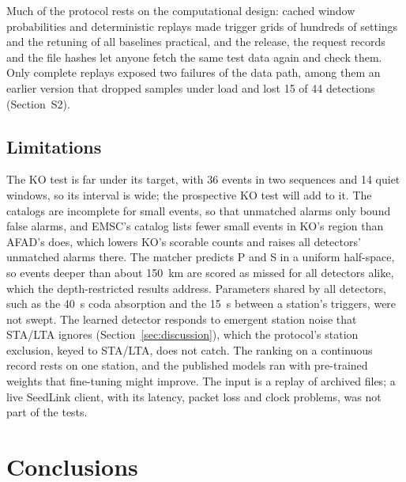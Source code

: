 \documentclass[a4paper,fleqn]{cas-sc}
\newcommand{\stalta}{STA/LTA}
\begin{document}
Much of the protocol rests on the computational design: cached window
probabilities and deterministic replays made trigger grids of hundreds of settings
and the retuning of all baselines practical, and the release, the request records
and the file hashes let anyone fetch the same test data again and check them. Only
complete replays exposed two failures of the data path, among them an earlier version
that dropped samples under load and lost 15 of 44 detections (Section~S2).

\subsection{Limitations}\label{sec:limits}

The KO test is far under its target, with
36 events in two sequences and 14 quiet windows, so its interval is wide; the
prospective KO test will add to it. The catalogs are incomplete for
small events, so that unmatched alarms only bound false alarms, and EMSC's catalog
lists fewer small events in KO's region than AFAD's does, which lowers KO's scorable
counts and raises all detectors' unmatched alarms there. The matcher predicts P and
S in a uniform half-space, so events deeper than about 150~km are scored as missed
for all detectors alike, which the depth-restricted results address.
Parameters shared by all detectors, such as the 40~s coda absorption and the 15~s
between a station's triggers, were not swept. The learned detector responds to emergent station noise that \stalta{} ignores
(Section~\ref{sec:discussion}), which the protocol's station exclusion, keyed to
\stalta{}, does not catch. The ranking on a continuous record rests on one station,
and the published models ran with pre-trained weights that fine-tuning
might improve. The input is a replay of archived files; a live SeedLink client, with
its latency, packet loss and clock problems, was not part of the tests.

\section{Conclusions}\label{sec:conclusions}
\end{document}
